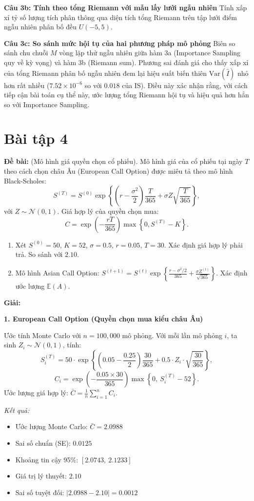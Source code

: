 \documentclass[12pt,a4paper]{article}
\begin{document}
\textbf{Câu 3b: Tính theo tổng Riemann với mẫu lấy lưới ngẫu nhiên}
Tính xấp xỉ tỷ số lượng tích phân thông qua diện tích tổng Riemann trên tập lưới điểm ngẫu nhiên phân bố đều $U(-5, 5)$.

\textbf{Câu 3c: So sánh mức hội tụ của hai phương pháp mô phỏng}
Biên so sánh chu chuỗi $M$ vòng lặp thử ngẫu nhiên giữa hàm 3a (Importance Sampling quy về kỳ vọng) và hàm 3b (Riemann sum). Phương sai đánh giá cho thấy xấp xỉ của tổng Riemann phân bố ngẫu nhiên đem lại hiệu suất biến thiên $\text{Var}(\hat{I})$ nhỏ hơn rất nhiều ($7.52 \times 10^{-6}$ so với $0.018$ của IS). Điều này xác nhận rằng, với cách tiếp cận bài toán cụ thể này, ước lượng tổng Riemann hội tụ và hiệu quả hơn hẳn so với Importance Sampling.

\section*{Bài tập 4}
\textbf{Đề bài:} (Mô hình giá quyền chọn cổ phiếu). Mô hình giá của cổ phiếu tại ngày $T$ theo cách chọn châu Âu (European Call Option) được miêu tả theo mô hình Black-Scholes:
\[
S^{(T)} = S^{(0)} \exp\left\{\left(r - \frac{\sigma^2}{2}\right)\frac{T}{365} + \sigma Z \sqrt{\frac{T}{365}}\right\},
\]
với $Z \sim \mathcal{N}(0,1)$. Giá hợp lý của quyền chọn mua:
\[
C = \exp\left(-\frac{rT}{365}\right) \max\left\{0, S^{(T)} - K\right\}.
\]
\begin{enumerate}
    \item[(a)] Xét $S^{(0)}=50$, $K=52$, $\sigma=0.5$, $r=0.05$, $T=30$. Xác định giá hợp lý phải trả. So sánh với $2.10$.
    \item[(b)] Mô hình Asian Call Option: $S^{(t+1)} = S^{(t)}\exp\left\{\frac{r-\sigma^2/2}{365} + \frac{\sigma Z^{(t)}}{\sqrt{365}}\right\}$. Xác định ước lượng $\mathbb{E}(A)$.
\end{enumerate}

\textbf{Giải:}

\textbf{1. European Call Option (Quyền chọn mua kiểu châu Âu)}

Ước tính Monte Carlo với $n = 100{,}000$ mô phỏng. Với mỗi lần mô phỏng $i$, ta sinh $Z_i \sim \mathcal{N}(0,1)$, tính:
\[
S_i^{(T)} = 50 \cdot \exp\left\{\left(0.05 - \frac{0.25}{2}\right)\frac{30}{365} + 0.5 \cdot Z_i \cdot \sqrt{\frac{30}{365}}\right\},
\]
\[
C_i = \exp\left(-\frac{0.05 \times 30}{365}\right) \max\left\{0,\ S_i^{(T)} - 52\right\}.
\]
Ước lượng giá hợp lý: $\bar{C} = \frac{1}{n}\sum_{i=1}^{n} C_i$.

\textit{Kết quả:}
\begin{itemize}
    \item Ước lượng Monte Carlo: $\bar{C} = 2.0988$
    \item Sai số chuẩn (SE): $0.0125$
    \item Khoảng tin cậy 95\%: $[2.0743,\ 2.1233]$
    \item Giá trị lý thuyết: $2.10$
    \item Sai số tuyệt đối: $|2.0988 - 2.10| = 0.0012$
\end{itemize}
\end{document}
